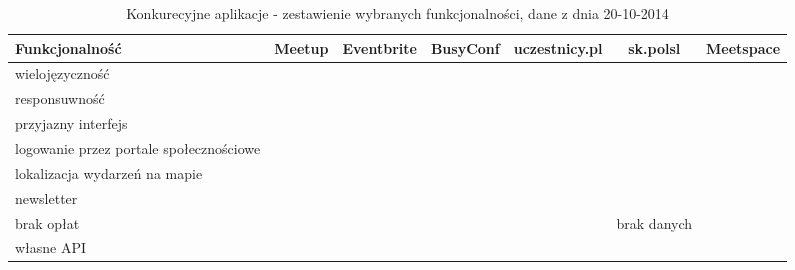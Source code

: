 \newcommand{\cmark}{\ding{51}}
\newcommand{\xmark}{\ding{55}}

\begin{landscape}
  \begin{table}[h]
    \begin{tabular}{|l|c|c|c|c|c|c|}
      \hline
      Funkcjonalność                          & Meetup & Eventbrite & BusyConf & uczestnicy.pl & sk.polsl    & \textbf{Meetspace} \\ \hline
      wielojęzyczność                         & \cmark & \cmark     & \xmark   & \xmark        & \xmark      & \cmark             \\ \hline
      responsuwność                           & \xmark & \cmark     & \cmark   & \cmark        & \xmark      & \cmark             \\ \hline
      przyjazny interfejs                     & \cmark & \cmark     & \cmark   & \xmark        & \xmark      & \cmark             \\ \hline
      logowanie przez portale społecznościowe & \cmark & \xmark     & \xmark   & \cmark        & \xmark      & \cmark             \\ \hline
      lokalizacja wydarzeń na mapie           & \xmark & \cmark     & \cmark   & \cmark        & \xmark      & \cmark             \\ \hline
      newsletter                              & \cmark & \xmark     & \xmark   & \xmark        & \xmark      & \cmark             \\ \hline
      brak opłat                              & \xmark & \cmark     & \xmark   & \xmark        & brak danych & \cmark             \\ \hline
      własne API                              & \cmark & \xmark     & \xmark   & \xmark        & \xmark      & \cmark             \\ \hline
    \end{tabular}
    \caption{Konkurecyjne aplikacje - zestawienie wybranych funkcjonalności, dane z dnia 20-10-2014}
  \end{table}
\end{landscape}
